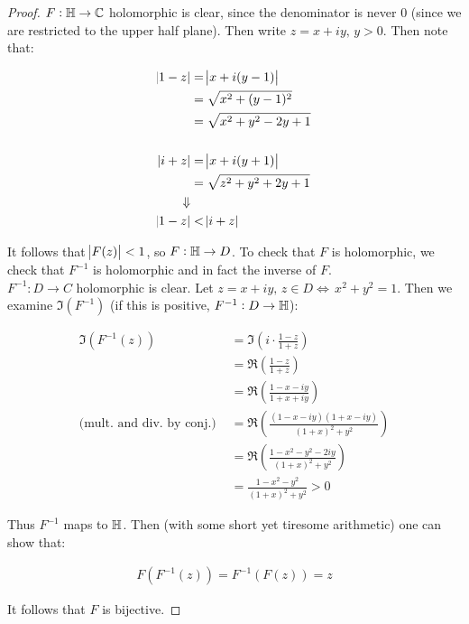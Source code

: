 \begin{proof}
$F: \mathbb{H} \to \mathbb{C}$ holomorphic is clear, since the denominator is never $0$ (since we are restricted to the upper half plane). Then write $z = x + iy, \, y >0$. Then note that:

\begin{align*}
    \abs{1-z } &= \abs{x + i(y-1)}\\
    &= \sqrt{x^2 +(y-1)^2}\\
    &= \sqrt{x^2 + y^2 - 2y +1}\\\\
    \abs{i+z} &= \abs{x+ i (y+1)}\\
    &= \sqrt{z^2 + y^2 +2y +1}\\
    \Downarrow\\
    \abs{1-z } &< \abs{i+z}
\end{align*}

It follows that $\abs{F(z)} <1$, so $F : \mathbb{H} \to D$. To check that $F$ is holomorphic, we check that $F^{-1}$ is holomorphic and in fact the inverse of $F$.\\

$F^{-1}:D \to C$ holomorphic is clear. Let $z = x+iy, \, z \in D \Leftrightarrow \, x^2+y^2 = 1$. Then we examine $\Im (F^{-1} )$ (if this is positive, $F^{-1}:D \to \mathbb{H}$):

\begin{align*}
    \Im \left( F^{-1}(z) \right) &= \Im \left( i \cdot \frac{1-z}{1+z} \right)\\ &= \Re \left( \frac{1-z}{1+z} \right)\\
    &= \Re \left( \frac{1-x-iy}{1+x+iy} \right)\\
   \text{(mult. and div. by conj.) } &= \Re \left( \frac{(1-x-iy)(1+x-iy)}{(1+x)^2+y^2} \right)\\
   &= \Re \left( \frac{1-x^2-y^2-2iy}{(1+x)^2+y^2} \right)\\
   &= \frac{1-x^2-y^2}{(1+x)^2+y^2} > 0
\end{align*}
 
Thus $F^{-1}$ maps to $\mathbb{H}$. Then (with some short yet tiresome arithmetic) one can show that: 

\begin{align*}
    F\left( F^{-1} (z) \right) = F^{-1}\left( F (z) \right) = z
\end{align*}

It follows that $F$ is bijective.
\end{proof}\\




